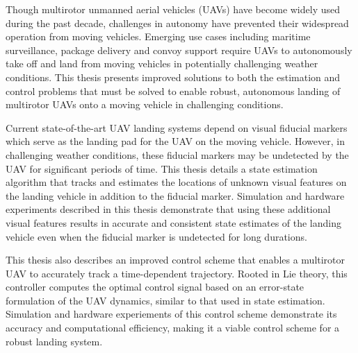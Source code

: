 \afterpage{\cleardoublepage}
Though multirotor unmanned aerial vehicles (UAVs) have become widely used 
during the past decade, challenges in autonomy have prevented their
widespread operation from moving vehicles. Emerging use cases including maritime
surveillance, package delivery and convoy support require UAVs to autonomously
take off and land from moving vehicles in potentially challenging weather
conditions. This thesis presents improved solutions to both the estimation and
control problems that must be solved
to enable robust, autonomous landing of multirotor UAVs onto a moving vehicle in
challenging conditions.

Current state-of-the-art UAV landing systems depend on visual fiducial markers
which serve as the landing pad for the UAV on the moving vehicle. However, in challenging weather
conditions, these fiducial markers may be undetected by the UAV for significant
periods of time. This thesis details a state estimation algorithm that tracks
and estimates the locations of unknown visual features on the landing vehicle in
addition to the fiducial marker. Simulation and hardware experiments described
in this thesis demonstrate that using these additional visual features results in
accurate and consistent state estimates of the landing vehicle even when the
fiducial marker is undetected for long durations.

This thesis also describes an improved control scheme that enables a multirotor
UAV to accurately track a time-dependent trajectory. Rooted in Lie theory, this
controller computes the optimal control signal based on an error-state
formulation of the UAV dynamics, similar to that used in state estimation.
Simulation and hardware experiements of this control scheme demonstrate its
accuracy and computational efficiency, making it a viable control scheme for a
robust landing system.
